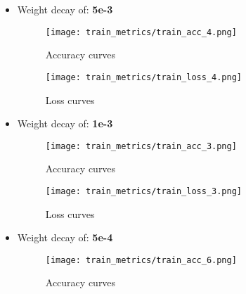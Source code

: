 \documentclass{article}
\begin{document}
\begin{itemize}
\begin{figure}[H]
\begin{minipage}{.5\textwidth}
    \end{minipage}
    \end{figure}
    
    \newpage
    \item Weight decay of: \textbf{5e-3}
    \begin{figure}[H]
    \centering
    \begin{minipage}{.5\linewidth}
        \centering
        \texttt{[image: train\_metrics/train\_acc\_4.png]}
        \vspace{-1.0em}
        \caption{Accuracy curves}

    \end{minipage}%
    \begin{minipage}{.5\textwidth}
      \centering
      \texttt{[image: train\_metrics/train\_loss\_4.png]}
      \vspace{-1.0em}
      \caption{Loss curves}

    \end{minipage}
    \end{figure}
    
    \item Weight decay of: \textbf{1e-3}
    \begin{figure}[H]
    \centering
    \begin{minipage}{.5\linewidth}
        \centering
        \texttt{[image: train\_metrics/train\_acc\_3.png]}
        \vspace{-1.0em}
        \caption{Accuracy curves}

    \end{minipage}%
    \begin{minipage}{.5\textwidth}
      \centering
      \texttt{[image: train\_metrics/train\_loss\_3.png]}
      \vspace{-1.0em}
      \caption{Loss curves}

    \end{minipage}
    \end{figure}
    
    \item Weight decay of: \textbf{5e-4}
    \begin{figure}[H]
    \centering
    \begin{minipage}{.5\linewidth}
        \centering
        \texttt{[image: train\_metrics/train\_acc\_6.png]}
        \vspace{-1.0em}
        \caption{Accuracy curves}


\end{minipage}
\end{figure}
\end{itemize}
\end{document}
